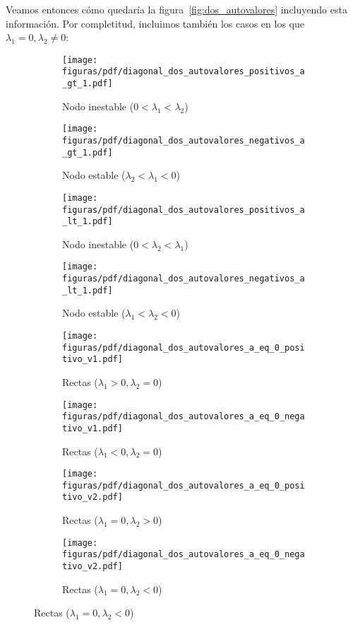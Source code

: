 \documentclass[../ecuaciones_diferenciales.tex]{subfiles}
\begin{document}
Veamos entonces cómo quedaría la figura~\ref{fig:dos_autovalores} incluyendo
esta información. Por completitud, incluimos también los casos en los que
\(\lambda_1 = 0, \lambda_2 \neq 0\):

\begin{figure}[ht]
  \centering
  \begin{subfigure}{0.25\textwidth}
    \centering
    \texttt{[image: figuras/pdf/diagonal\_dos\_autovalores\_positivos\_a\_gt\_1.pdf]}
    \caption*{Nodo inestable (\(0 < \lambda_1 < \lambda_2\))}
  \end{subfigure}%
  \begin{subfigure}{0.25\textwidth}
    \centering
    \texttt{[image: figuras/pdf/diagonal\_dos\_autovalores\_negativos\_a\_gt\_1.pdf]}
    \caption*{Nodo estable (\(\lambda_2 < \lambda_1 < 0\))}
  \end{subfigure}%
  \begin{subfigure}{0.25\textwidth}
    \centering
    \texttt{[image: figuras/pdf/diagonal\_dos\_autovalores\_positivos\_a\_lt\_1.pdf]}
    \caption*{Nodo inestable (\(0 < \lambda_2 < \lambda_1\))}
  \end{subfigure}%
  \begin{subfigure}{0.25\textwidth}
    \centering
    \texttt{[image: figuras/pdf/diagonal\_dos\_autovalores\_negativos\_a\_lt\_1.pdf]}
    \caption*{Nodo estable (\(\lambda_1 < \lambda_2 < 0\))}
  \end{subfigure}
  \begin{subfigure}{0.25\textwidth}
    \centering
    \texttt{[image: figuras/pdf/diagonal\_dos\_autovalores\_a\_eq\_0\_positivo\_v1.pdf]}
    \caption*{Rectas (\(\lambda_1 > 0, \lambda_2 = 0\))}
  \end{subfigure}%
  \begin{subfigure}{0.25\textwidth}
    \centering
    \texttt{[image: figuras/pdf/diagonal\_dos\_autovalores\_a\_eq\_0\_negativo\_v1.pdf]}
    \caption*{Rectas (\(\lambda_1 < 0, \lambda_2 = 0\))}
  \end{subfigure}%
  \begin{subfigure}{0.25\textwidth}
    \centering
    \texttt{[image: figuras/pdf/diagonal\_dos\_autovalores\_a\_eq\_0\_positivo\_v2.pdf]}
    \caption*{Rectas (\(\lambda_1 = 0, \lambda_2 > 0\))}
  \end{subfigure}%
  \begin{subfigure}{0.25\textwidth}
    \centering
    \texttt{[image: figuras/pdf/diagonal\_dos\_autovalores\_a\_eq\_0\_negativo\_v2.pdf]}
    \caption*{Rectas (\(\lambda_1 = 0, \lambda_2 < 0\))}
  \end{subfigure}

\end{figure}
\end{document}
